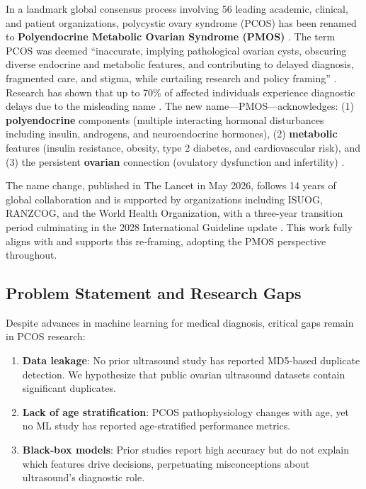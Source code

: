 \documentclass[conference]{IEEEtran}
\begin{document}
In a landmark global consensus process involving 56 leading academic, clinical, and patient organizations, polycystic ovary syndrome (PCOS) has been renamed to \textbf{Polyendocrine Metabolic Ovarian Syndrome (PMOS)} \cite{TeedeLancet2026}. The term PCOS was deemed “inaccurate, implying pathological ovarian cysts, obscuring diverse endocrine and metabolic features, and contributing to delayed diagnosis, fragmented care, and stigma, while curtailing research and policy framing” \cite{TeedeLancet2026}. Research has shown that up to 70\% of affected individuals experience diagnostic delays due to the misleading name \cite{ContemporaryOBGYN2026}. The new name—PMOS—acknowledges: (1) \textbf{polyendocrine} components (multiple interacting hormonal disturbances including insulin, androgens, and neuroendocrine hormones), (2) \textbf{metabolic} features (insulin resistance, obesity, type 2 diabetes, and cardiovascular risk), and (3) the persistent \textbf{ovarian} connection (ovulatory dysfunction and infertility) \cite{ContemporaryOBGYN2026}. 

The name change, published in The Lancet in May 2026, follows 14 years of global collaboration and is supported by organizations including ISUOG, RANZCOG, and the World Health Organization, with a three-year transition period culminating in the 2028 International Guideline update \cite{TeedeLancet2026, RANZCOG2026, ISUOG2026}. This work fully aligns with and supports this re‑framing, adopting the PMOS perspective throughout.

\subsection{Problem Statement and Research Gaps}

Despite advances in machine learning for medical diagnosis, critical gaps remain in PCOS research:

\begin{enumerate}
\item \textbf{Data leakage}: No prior ultrasound study has reported MD5‑based duplicate detection. We hypothesize that public ovarian ultrasound datasets contain significant duplicates.
\item \textbf{Lack of age stratification}: PCOS pathophysiology changes with age, yet no ML study has reported age‑stratified performance metrics.
\item \textbf{Black‑box models}: Prior studies report high accuracy but do not explain which features drive decisions, perpetuating misconceptions about ultrasound’s diagnostic role.
\end{enumerate}
\end{document}
